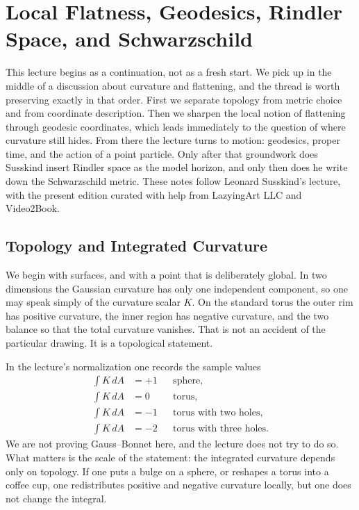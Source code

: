 \chapter{Local Flatness, Geodesics, Rindler Space, and Schwarzschild}

This lecture begins as a continuation, not as a fresh start. We pick up in the middle of a discussion about curvature and flattening, and the thread is worth preserving exactly in that order. First we separate topology from metric choice and from coordinate description. Then we sharpen the local notion of flattening through geodesic coordinates, which leads immediately to the question of where curvature still hides. From there the lecture turns to motion: geodesics, proper time, and the action of a point particle. Only after that groundwork does Susskind insert Rindler space as the model horizon, and only then does he write down the Schwarzschild metric. These notes follow Leonard Susskind's lecture, with the present edition curated with help from LazyingArt LLC and Video2Book.

\section{Topology and Integrated Curvature}

We begin with surfaces, and with a point that is deliberately global. In two dimensions the Gaussian curvature has only one independent component, so one may speak simply of the curvature scalar \(K\). On the standard torus the outer rim has positive curvature, the inner region has negative curvature, and the two balance so that the total curvature vanishes. That is not an accident of the particular drawing. It is a topological statement.

In the lecture's normalization one records the sample values
\begin{align}
\int K\,dA &= +1 && \text{sphere},\\
\int K\,dA &= 0 && \text{torus},\\
\int K\,dA &= -1 && \text{torus with two holes},\\
\int K\,dA &= -2 && \text{torus with three holes}.
\end{align}
We are not proving Gauss--Bonnet here, and the lecture does not try to do so. What matters is the scale of the statement: the integrated curvature depends only on topology. If one puts a bulge on a sphere, or reshapes a torus into a coffee cup, one redistributes positive and negative curvature locally, but one does not change the integral.


